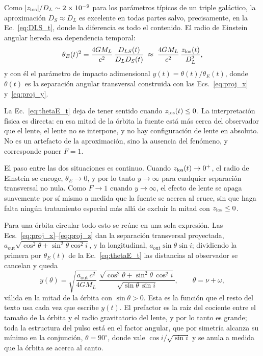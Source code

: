 \documentclass[11pt,a4paper,openany]{book}
\newcommand{\aout}{a_{\mathrm{out}}}
\begin{document}
Como $|z_{\rm los}|/D_L\sim2\times10^{-9}$ para los par\'ametros t\'ipicos de
un triple gal\'actico, la aproximaci\'on $D_S\approx D_L$ es excelente en
todas partes salvo, precisamente, en la Ec.~\eqref{eq:DLS_t}, donde la
diferencia es todo el contenido. El radio de Einstein angular hereda esa
dependencia temporal:
\begin{equation}
  \theta_E(t)^{2}=\frac{4GM_L}{c^{2}}\,\frac{D_{LS}(t)}{D_LD_S(t)}
  \;\approx\;\frac{4GM_L}{c^{2}}\,\frac{z_{\rm los}(t)}{D_L^{2}} ,
  \label{eq:thetaE_t}
\end{equation}
y con \'el el par\'ametro de impacto adimensional
$y(t)=\theta(t)/\theta_E(t)$, donde $\theta(t)$ es la separaci\'on angular
transversal construida con las Ecs.~\eqref{eq:proj_x} y~\eqref{eq:proj_y}.

La Ec.~\eqref{eq:thetaE_t} deja de tener sentido cuando
$z_{\rm los}(t)\le0$. La interpretaci\'on f\'isica es directa: en esa mitad de
la \'orbita la fuente est\'a m\'as cerca del observador que el lente, el lente
no se interpone, y no hay configuraci\'on de lente en absoluto. No es un
artefacto de la aproximaci\'on, sino la ausencia del fen\'omeno, y
corresponde poner $F=1$.

El paso entre las dos situaciones es continuo. Cuando
$z_{\rm los}(t)\to0^{+}$, el radio de Einstein se encoge, $\theta_E\to0$, y
por lo tanto $y\to\infty$ para cualquier separaci\'on transversal no nula. Como
$F\to1$ cuando $y\to\infty$, el efecto de lente se apaga suavemente por s\'i
mismo a medida que la fuente se acerca al cruce, sin que haga falta ning\'un
tratamiento especial m\'as all\'a de excluir la mitad con
$z_{\rm los}\le0$.

Para una \'orbita circular todo esto se re\'une en una sola expresi\'on. Las
Ecs.~\eqref{eq:proj_x}--\eqref{eq:proj_z} dan la separaci\'on transversal
proyectada, $\aout\sqrt{\cos^{2}\theta+\sin^{2}\theta\cos^{2}i}$, y la
longitudinal, $\aout\sin\theta\sin i$; dividiendo la primera por
$\theta_E(t)$ de la Ec.~\eqref{eq:thetaE_t} las distancias al observador se
cancelan y queda
\begin{equation}
  y(\theta)=\sqrt{\frac{\aout\,c^{2}}{4GM_L}}\;
  \frac{\sqrt{\cos^{2}\theta+\sin^{2}\theta\,\cos^{2}i}}
       {\sqrt{\sin\theta\,\sin i}} ,
  \qquad \theta=\nu+\omega ,
  \label{eq:y_de_theta}
\end{equation}
v\'alida en la mitad de la \'orbita con $\sin\theta>0$. Esta es la funci\'on
que el resto del texto usa cada vez que escribe $y(t)$. El prefactor es la
ra\'iz del cociente entre el tama\~no de la \'orbita y el radio gravitatorio
del lente, y por lo tanto es grande; toda la estructura del pulso est\'a en el
factor angular, que por simetr\'ia alcanza su m\'inimo en la conjunci\'on,
$\theta=90^{\circ}$, donde vale $\cos i/\sqrt{\sin i}$ y se anula a medida que
la \'orbita se acerca al canto.
\end{document}
